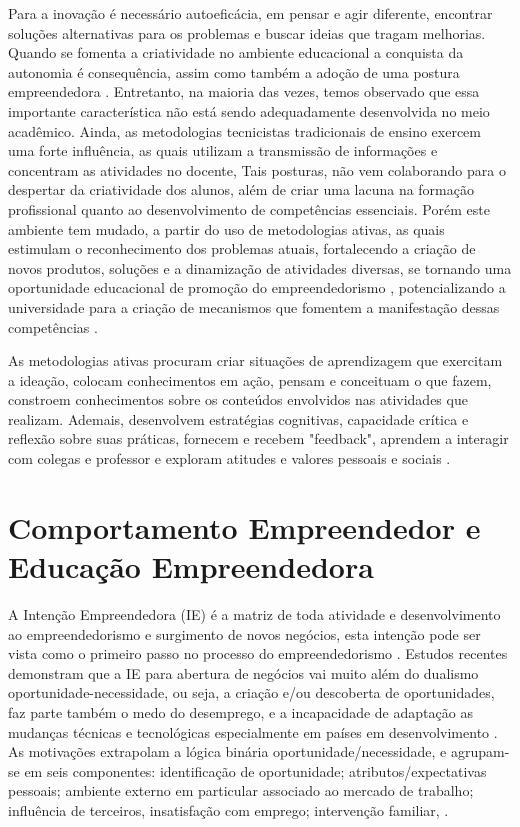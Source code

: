 Para a inovação é necessário autoeficácia, em pensar e agir diferente, encontrar soluções alternativas para os problemas e buscar ideias que tragam melhorias. Quando se fomenta a criatividade no ambiente educacional a conquista da autonomia é consequência, assim como também a adoção de uma postura empreendedora \cite{gonzalez_predictors_2009}. Entretanto, na maioria das vezes, temos observado que essa importante característica não está sendo adequadamente desenvolvida no meio acadêmico. Ainda, as metodologias tecnicistas tradicionais de ensino exercem uma forte influência, as quais utilizam a transmissão de informações e concentram as atividades no docente, Tais posturas, não vem colaborando para o despertar da criatividade dos alunos, além de criar uma lacuna na formação profissional quanto ao desenvolvimento de competências essenciais. Porém este ambiente tem mudado, a partir do uso de metodologias ativas, as quais estimulam o reconhecimento dos problemas atuais, fortalecendo a criação de novos produtos, soluções e a dinamização de atividades diversas, se tornando uma oportunidade educacional de promoção do empreendedorismo \cite{faria_promocao_2018}, potencializando a universidade para a criação de mecanismos que fomentem a manifestação dessas competências \cite{audy_innovation_2006}.

As metodologias ativas procuram criar situações de aprendizagem que exercitam a ideação, colocam conhecimentos em ação, pensam e conceituam o que fazem, constroem conhecimentos sobre os conteúdos envolvidos nas atividades que realizam. Ademais, desenvolvem estratégias cognitivas, capacidade crítica e reflexão sobre suas práticas, fornecem e recebem "feedback", aprendem a interagir com colegas e professor e exploram atitudes e valores pessoais e sociais \cite{berbel_as_2011}. 

\section{Comportamento Empreendedor e Educação Empreendedora}

A Intenção Empreendedora (IE) é a matriz de toda atividade e desenvolvimento ao empreendedorismo e surgimento de novos negócios, esta intenção pode ser vista como o primeiro passo no processo do empreendedorismo \cite{zhao_relationship_2010, shirokova_exploring_2016}. Estudos recentes demonstram que a IE para abertura de negócios vai muito além do dualismo oportunidade-necessidade, ou seja, a criação e/ou descoberta de oportunidades, faz parte também o medo do desemprego, e a incapacidade de adaptação as mudanças técnicas e tecnológicas especialmente em países em desenvolvimento \cite{vale_motivacoes_2014}. As motivações extrapolam a lógica binária oportunidade/necessidade, e agrupam-se em seis componentes: identificação de oportunidade; atributos/expectativas pessoais; ambiente externo em particular associado ao mercado de trabalho; influência de terceiros, insatisfação com emprego; intervenção familiar, \cite{vale_motivacoes_2014, rodrigues_intencao_2019,ferreira_intencao_2017}.



